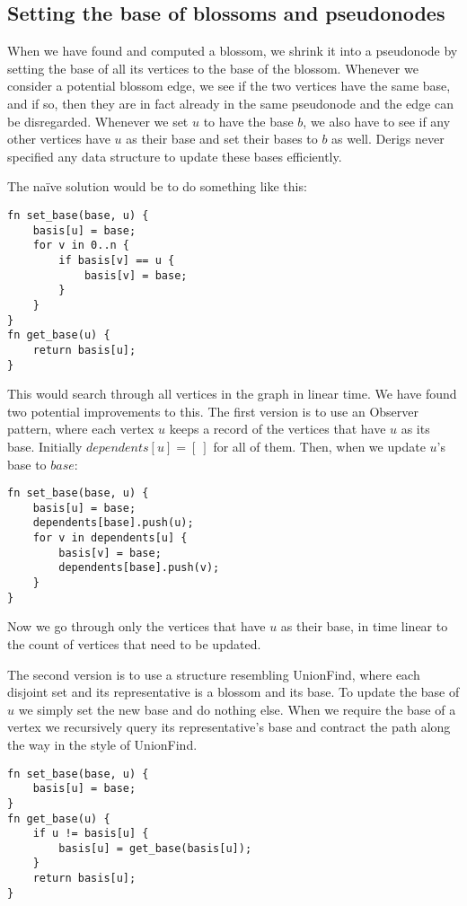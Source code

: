 \subsection{Setting the base of blossoms and pseudonodes}
\label{subsection:basis-code}
When we have found and computed a blossom, we shrink it into a pseudonode by setting the base of all its vertices to the base of the blossom. Whenever we consider a potential blossom edge, we see if the two vertices have the same base, and if so, then they are in fact already in the same pseudonode and the edge can be disregarded. Whenever we set $u$ to have the base $b$, we also have to see if any other vertices have $u$ as their base and set their bases to $b$ as well. Derigs never specified any data structure to update these bases efficiently.

The naïve solution would be to do something like this:
\begin{lstlisting}[caption={Näive basis},label=Listing,mathescape=true]
fn set_base(base, u) {
    basis[u] = base;
    for v in 0..n {
        if basis[v] == u {
            basis[v] = base;
        }
    }
}
fn get_base(u) {
    return basis[u];
}
\end{lstlisting}
This would search through all vertices in the graph in linear time. We have found two potential improvements to this. The first version is to use an Observer pattern, where each vertex $u$ keeps a record of the vertices that have $u$ as its base. Initially $dependents[u] = [~]$ for all of them. Then, when we update $u$'s base to $base$:

\begin{lstlisting}[caption={Observer basis},label=Listing,mathescape=true]
fn set_base(base, u) {
    basis[u] = base;
    dependents[base].push(u);
    for v in dependents[u] {
        basis[v] = base;
        dependents[base].push(v);
    }
}
\end{lstlisting}

Now we go through only the vertices that have $u$ as their base, in time linear to the count of vertices that need to be updated.

The second version is to use a structure resembling UnionFind, where each disjoint set and its representative is a blossom and its base. To update the base of $u$ we simply set the new base and do nothing else. When we require the base of a vertex we recursively query its representative's base and contract the path along the way in the style of UnionFind. 

\begin{lstlisting}[caption={UF-like basis},label=Listing,mathescape=true]
fn set_base(base, u) {
    basis[u] = base;
}
fn get_base(u) {
    if u != basis[u] {
        basis[u] = get_base(basis[u]);
    }
    return basis[u];
}
\end{lstlisting}

